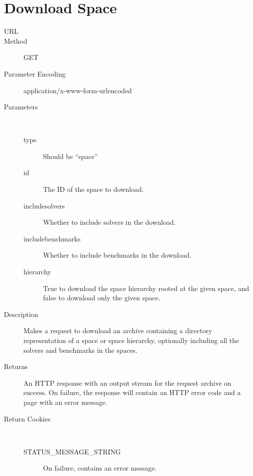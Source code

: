 \section{Download Space}
\begin{description}
\item [URL] 
\item [Method] GET
\item [Parameter Encoding] application/x-www-form-urlencoded
\item [Parameters] \
	\begin{description}
	\item [type]  Should be ``space''
	\item [id]  The ID of the space to download.
	\item [includesolvers]  Whether to include solvers in the download.
	\item [includebenchmarks]  Whether to include benchmarks in the download.
	\item [hierarchy] \type{Boolean} True to download the space hierarchy rooted at the given space, and false to download only the given space.
	\end{description}
\item [Description] Makes a request to download an archive containing a directory representation of a space or space hierarchy, optionally including all the solvers and benchmarks in the spaces.
\item [Returns] An HTTP response with an output stream for the request archive on success. On failure, the response will contain an HTTP error code and a page with an error message.
\item [Return Cookies] \
	\begin{description}
	\item [STATUS\_MESSAGE\_STRING]  On failure, contains an error message.
	\end{description}
\end{description}

